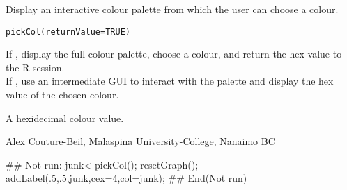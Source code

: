 \documentclass[letterpaper]{book}
\begin{document}
\begin{Description}\relax
Display an interactive colour palette from which the user can choose a colour.
\end{Description}
\begin{Usage}
\begin{verbatim}pickCol(returnValue=TRUE)\end{verbatim}
\end{Usage}
\begin{Arguments}
\begin{ldescription}
\item[\code{returnValue}] If , display the full colour palette, choose a colour, 
and return the hex value to the R session. \\ If , use an intermediate 
GUI to interact with the palette and display the hex value of the chosen colour.
\end{ldescription}
\end{Arguments}
\begin{Value}
A hexidecimal colour value.
\end{Value}
\begin{Author}\relax
Alex Couture-Beil, Malaspina University-College, Nanaimo BC
\end{Author}
\begin{SeeAlso}\relax
{}
\end{SeeAlso}
\begin{Examples}
\begin{ExampleCode}
## Not run: 
junk<-pickCol(); resetGraph(); addLabel(.5,.5,junk,cex=4,col=junk);
## End(Not run)
\end{ExampleCode}
\end{Examples}
\end{document}
